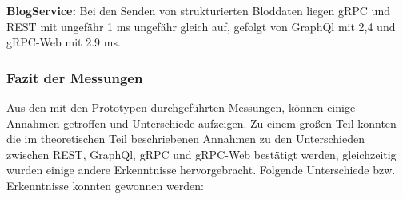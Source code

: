 \textbf{BlogService:}  
Bei den Senden von strukturierten Bloddaten liegen gRPC und REST mit ungefähr 1 ms ungefähr gleich auf, gefolgt von GraphQl mit 2,4 und gRPC-Web mit 2.9 ms.

\clearpage
\subsubsection*{Fazit der Messungen}
Aus den mit den Prototypen durchgeführten Messungen, können einige Annahmen getroffen und Unterschiede aufzeigen. Zu einem großen Teil konnten die im theoretischen Teil beschriebenen Annahmen zu den Unterschieden zwischen REST, GraphQl, gRPC und gRPC-Web bestätigt werden, gleichzeitig wurden einige andere Erkenntnisse hervorgebracht. Folgende Unterschiede bzw. Erkenntnisse konnten gewonnen werden:

\chapterend

